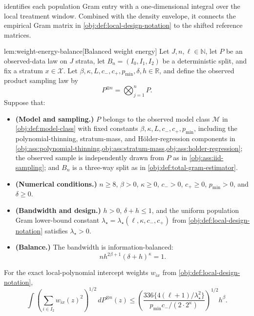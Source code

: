 \documentclass[11pt]{article}
\begin{document}
 identifies each population Gram entry with a one-dimensional integral over the local treatment window. Combined with the density envelope, it connects the empirical Gram matrix in \cref{obj:def:local-design-notation} to the shifted reference matrices.

\begin{lemmav}{lem:weight-energy-balance}[Balanced weight energy]
Let \(J,n,\ell\in\mathbb N\), let \(P\) be an observed-data law on \(J\) strata, let \(B_n=(I_0,I_1,I_2)\) be a deterministic split, and fix a stratum \(x\in\mathcal X\).  Let \(\beta,\kappa,L,c_-,c_+,p_{\min},\delta,h\in\mathbb R\), and define the observed product sampling law by
\[
P^{\otimes n}=\bigotimes_{j=1}^n P .
\]
Suppose that:
\begin{itemize}
\item \textbf{(Model and sampling.)} \(P\) belongs to the observed model class \(\mathcal M\) in \cref{obj:def:model-class} with fixed constants \(\beta,\kappa,L,c_-,c_+,p_{\min}\), including the polynomial-thinning, stratum-mass, and Hölder-regression components in \cref{obj:ass:polynomial-thinning,obj:ass:stratum-mass,obj:ass:holder-regression}; the observed sample is independently drawn from \(P\) as in \cref{obj:ass:iid-sampling}; and \(B_n\) is a three-way split as in \cref{obj:def:total-gram-estimator}.
\item \textbf{(Numerical conditions.)} \(n\ge 8\), \(\beta>0\), \(\kappa\ge0\), \(c_->0\), \(c_+\ge0\), \(p_{\min}>0\), and \(\delta\ge0\).
\item \textbf{(Bandwidth and design.)} \(h>0\), \(\delta+h\le1\), and the uniform population Gram lower-bound constant \(\lambda_\star=\lambda_\star(\ell,\kappa,c_-,c_+)\) from \cref{obj:def:local-design-notation} satisfies \(\lambda_\star>0\).
\item \textbf{(Balance.)} The bandwidth is information-balanced:
\[
n h^{2\beta+1}(\delta+h)^\kappa=1.
\]
\end{itemize}
For the exact local-polynomial intercept weights \(w_{ix}\) from \cref{obj:def:local-design-notation},
\[
\int
\left(\sum_{i\in I_2} w_{ix}(z)^2\right)^{1/2}
\,dP^{\otimes n}(z)
\le
\left(
\frac{336\{4(\ell+1)/\lambda_\star^2\}}
{p_{\min}c_-/(2\cdot 2^\kappa)}
\right)^{1/2}
h^\beta .
\]
\end{lemmav}
\end{document}
